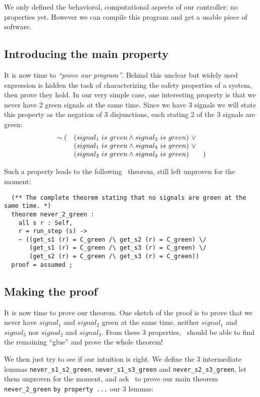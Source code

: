 We only defined the behavioral, computational aspects of our
controller: no pro\-per\-ties yet. However we can compile this program and
get a usable piece of software.

\subsection{Introducing the main property}

It is now time to {\em ``prove our program''}. Behind this unclear but
widely used expression is hidden the task of characterizing the safety
properties of a system, then prove they hold. In our very simple case,
one interesting property is that we never have 2 green signals at the
same time. Since we have 3 signals we will state this property as the
negation of 3 disjunctions, each stating 2 of the 3 signals are green:
$$
\begin{array}{clc}
\sim ( & (signal_1\ is\ green \logand signal_2\ is\ green)\ \logor & \\
          & (signal_1\ is\ green \logand signal_3\ is\ green)\ \logor & \\
          & (signal_2\ is\ green \logand signal_3\ is\ green) & )
\end{array}
$$

Such a property leads to the following \focal\ theorem, still left
unproven for the moment:

{\scriptsize
\begin{lstlisting}
  (** The complete theorem stating that no signals are green at the same time. *)
  theorem never_2_green :
    all s r : Self,
    r = run_step (s) ->
    ~ ((get_s1 (r) = C_green /\ get_s2 (r) = C_green) \/
       (get_s1 (r) = C_green /\ get_s3 (r) = C_green) \/
       (get_s2 (r) = C_green /\ get_s3 (r) = C_green))
  proof = assumed ;
\end{lstlisting}}

\subsection{Making the proof}

It is now time to prove our theorem. One sketch of the proof is to
prove that we never have $signal_1$ and $signal_2$ green at the same
time, neither $signal_1$ and $signal_3$ nor $signal_2$ and $signal_3$.
From these 3 properties, \zenon\ should be able to find the remaining
``glue''  and prove the whole theorem!

We then just try to see if our intuition is right. We define the 3
intermediate lemmas \lstinline"never_s1_s2_green",
\lstinline"never_s1_s3_green" and \lstinline"never_s2_s3_green", let them
unproven for the moment, and ask \zenon\ to prove our main theorem
\lstinline"never_2_green" \lstinline"by property ..." our 3 lemmas:

